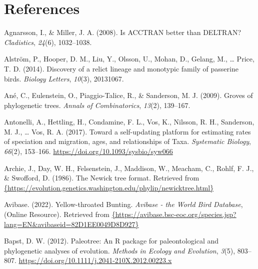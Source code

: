 \documentclass[english,man]{apa6}
\begin{document}
\newpage

\hypertarget{references}{%
\section{References}\label{references}}

\begingroup
\setlength{\parindent}{-0.5in}
\setlength{\leftskip}{0.5in}

\hypertarget{refs}{}
\leavevmode\hypertarget{ref-agnarsson2008acctran}{}%
Agnarsson, I., \& Miller, J. A. (2008). Is ACCTRAN better than DELTRAN? \emph{Cladistics}, \emph{24}(6), 1032--1038.

\leavevmode\hypertarget{ref-alstrom2014discovery}{}%
Alström, P., Hooper, D. M., Liu, Y., Olsson, U., Mohan, D., Gelang, M., \ldots{} Price, T. D. (2014). Discovery of a relict lineage and monotypic family of passerine birds. \emph{Biology Letters}, \emph{10}(3), 20131067.

\leavevmode\hypertarget{ref-ane2009groves}{}%
Ané, C., Eulenstein, O., Piaggio-Talice, R., \& Sanderson, M. J. (2009). Groves of phylogenetic trees. \emph{Annals of Combinatorics}, \emph{13}(2), 139--167.

\leavevmode\hypertarget{ref-antonelli2017supersmart}{}%
Antonelli, A., Hettling, H., Condamine, F. L., Vos, K., Nilsson, R. H., Sanderson, M. J., \ldots{} Vos, R. A. (2017). Toward a self-updating platform for estimating rates of speciation and migration, ages, and relationships of Taxa. \emph{Systematic Biology}, \emph{66}(2), 153--166. \url{https://doi.org/10.1093/sysbio/syw066}

\leavevmode\hypertarget{ref-archie1986newick}{}%
Archie, J., Day, W. H., Felsenstein, J., Maddison, W., Meacham, C., Rohlf, F. J., \& Swofford, D. (1986). The Newick tree format. Retrieved from \href{\%7Bhttps://evolution.genetics.washington.edu/phylip/newicktree.html\%7D}{\{https://evolution.genetics.washington.edu/phylip/newicktree.html\}}

\leavevmode\hypertarget{ref-avibase-emberiza}{}%
Avibase. (2022). Yellow-throated Bunting. \emph{Avibase - the World Bird Database}, (Online Resource). Retrieved from \href{\%7Bhttps://avibase.bsc-eoc.org/species.jsp?lang=EN\&avibaseid=82D1EE0049D8D927\%7D}{\{https://avibase.bsc-eoc.org/species.jsp?lang=EN\&avibaseid=82D1EE0049D8D927\}}

\leavevmode\hypertarget{ref-Bapst2012a}{}%
Bapst, D. W. (2012). Paleotree: An R package for paleontological and phylogenetic analyses of evolution. \emph{Methods in Ecology and Evolution}, \emph{3}(5), 803--807. \url{https://doi.org/10.1111/j.2041-210X.2012.00223.x}
\end{document}
